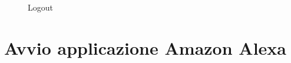 \begin{enumerate}
	\begin{figure}[!ht]
		\centering
		\caption{Logout}
	\end{figure}
\end{enumerate}

\newpage
\section{Avvio applicazione Amazon Alexa}
\label{Avviso Amazon Alexa}
